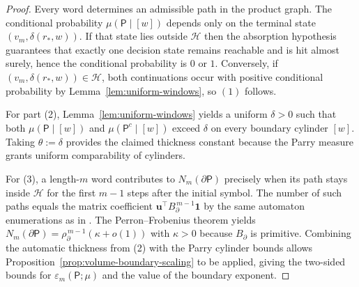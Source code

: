 \begin{proof}
Every word determines an admissible path in the product graph.  The conditional
probability $\mu(\mathsf{P}\mid[w])$ depends only on the terminal state
$(v_m,\delta(r_\ast,w))$.  If that state lies outside $\mathcal{H}$ then the
absorption hypothesis guarantees that exactly one decision state remains
reachable and is hit almost surely, hence the conditional probability is $0$
or $1$.  Conversely, if $(v_m,\delta(r_\ast,w))\in\mathcal{H}$, both
continuations occur with positive conditional probability by
Lemma~\ref{lem:uniform-windows}, so $(1)$ follows.

For part (2), Lemma~\ref{lem:uniform-windows} yields a uniform $\delta>0$ such
that both $\mu(\mathsf{P}\mid[w])$ and $\mu(\mathsf{P}^c\mid[w])$ exceed
$\delta$ on every boundary cylinder $[w]$.  Taking $\theta:=\delta$ provides
the claimed thickness constant because the Parry measure grants uniform
comparability of cylinders.

For (3), a length-$m$ word contributes to $N_m(\partial\mathsf{P})$ precisely
when its path stays inside $\mathcal{H}$ for the first $m-1$ steps after the
initial symbol.  The number of such paths equals the matrix coefficient
$\mathbf{u}^\top B_\partial^{\,m-1} \mathbf{1}$ by the same automaton enumerations as
in \cite{Rabin1963,BoylePetersenHMP}.  The Perron--Frobenius theorem yields
$N_m(\partial\mathsf{P})=\rho_\partial^{\,m-1}(\kappa+o(1))$ with $\kappa>0$ because
$B_\partial$ is primitive.  Combining the automatic thickness from (2) with the
Parry cylinder bounds allows
Proposition~\ref{prop:volume-boundary-scaling} to be applied, giving the
two-sided bounds for $\varepsilon_m(\mathsf{P};\mu)$ and the value of the
boundary exponent.
\end{proof}

